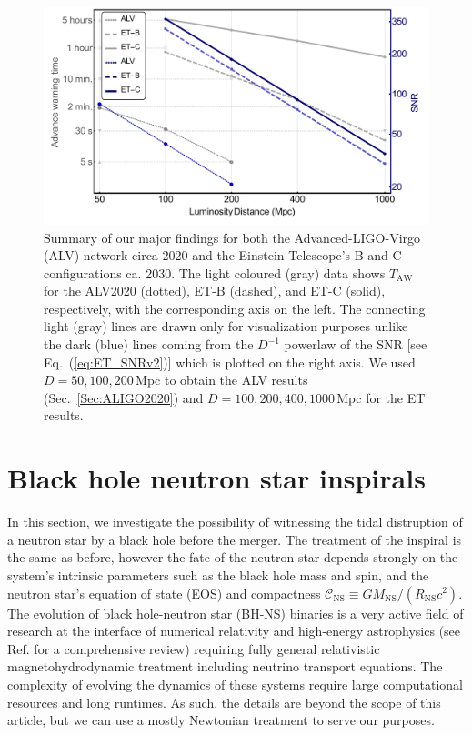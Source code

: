 \documentclass[prd,amsmath,amssymb,aps,floats,amsfonts,notitlepage,superscriptaddress,eqsecnum,nofootinbib,10pt]{revtex4-1}
\begin{document}
%
%
%
\begin{figure}[ht!]
\includegraphics[width=\linewidth]{../Figures/Main_results.pdf}
\caption{Summary of our major findings for both the Advanced-LIGO-Virgo (ALV) network circa 2020 and the Einstein Telescope's B and C configurations
ca. 2030. The light coloured (gray) data shows $T_\text{AW}$ for the ALV2020 (dotted), ET-B (dashed), and ET-C (solid), respectively, with the corresponding axis on the left.
The connecting light (gray) lines are drawn only for visualization purposes unlike the dark (blue) lines coming from the $D^{-1}$ powerlaw of the SNR [see Eq.~(\ref{eq:ET_SNRv2})] which is plotted on the right axis. 
We used $D=50,100,200\,$Mpc to obtain the ALV results (Sec.~\ref{Sec:ALIGO2020}) and $D=100,200,400,1000\,$Mpc for the ET results.}\label{fig:summary}
\end{figure}
%
%
%
%
%
\section{Black hole neutron star inspirals}\label{sec:BH_NS}
In this section, we investigate the possibility of witnessing the tidal distruption of a neutron star by a black hole before the merger.
The treatment of the inspiral is the same as before, however the fate of the neutron star depends strongly on the system's intrinsic parameters
such as the black hole mass and spin, and the neutron star's equation of state (EOS) and compactness $\mathcal{C}_\text{NS}\equiv G M_\text{NS}/(R_\text{NS}c^2)$. 
The evolution of black hole-neutron star (BH-NS) binaries is a very active field of research at the interface of numerical relativity and high-energy astrophysics
(see Ref. \cite{Shibata:2011jka} for a comprehensive review) requiring fully general relativistic magnetohydrodynamic treatment including neutrino transport equations.
The complexity of evolving the dynamics of these systems require large computational resources and long runtimes.
As such, the details are beyond the scope of this article, but we can use a mostly Newtonian treatment to serve our purposes. %
\end{document}
